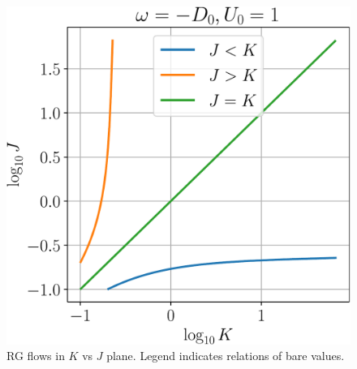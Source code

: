 \documentclass[12pt,twoside]{report}
\numberwithin{equation}{section}
\begin{document}
\begin{figure}[htpb]
	\centering
	\includegraphics[scale=0.4]{../figures/JvsK.pdf}
	\caption{RG flows in \(K\) vs \(J\) plane. Legend indicates relations of bare values.}
	\label{JvsK}
\end{figure}
\end{document}
